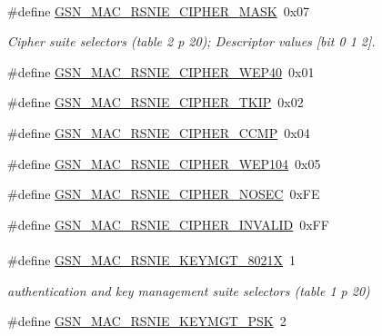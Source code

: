 \paragraph*{}
\begin{DoxyCompactItemize}
\item 
\#define \hyperlink{a00642_ga9f1db3741ca60ee70690fe908f615b05}{GSN\_\-MAC\_\-RSNIE\_\-CIPHER\_\-MASK}~0x07
\begin{DoxyCompactList}\small\item\em Cipher suite selectors (table 2 p 20); Descriptor values \mbox{[}bit 0 1 2\mbox{]}. \end{DoxyCompactList}\item 
\#define \hyperlink{a00642_gabb256ee389628678d07227a262c724cd}{GSN\_\-MAC\_\-RSNIE\_\-CIPHER\_\-WEP40}~0x01
\item 
\#define \hyperlink{a00642_ga923f017a53927b85c88857723b490d0f}{GSN\_\-MAC\_\-RSNIE\_\-CIPHER\_\-TKIP}~0x02
\item 
\#define \hyperlink{a00642_gae128a6f53a21ed1dd5cc751f5f76b063}{GSN\_\-MAC\_\-RSNIE\_\-CIPHER\_\-CCMP}~0x04
\item 
\#define \hyperlink{a00642_ga4a472fd868a0633cf337c1a3c4b0a8ed}{GSN\_\-MAC\_\-RSNIE\_\-CIPHER\_\-WEP104}~0x05
\item 
\#define \hyperlink{a00642_ga29ef5d37177a52a22dd6707dd3e943cf}{GSN\_\-MAC\_\-RSNIE\_\-CIPHER\_\-NOSEC}~0xFE
\item 
\#define \hyperlink{a00642_ga6498ff5acf21d809adebf490aaeb1158}{GSN\_\-MAC\_\-RSNIE\_\-CIPHER\_\-INVALID}~0xFF
\end{DoxyCompactItemize}

\paragraph*{}
\begin{DoxyCompactItemize}
\item 
\#define \hyperlink{a00642_ga66753c440ce19038fd3676c28b340ba3}{GSN\_\-MAC\_\-RSNIE\_\-KEYMGT\_\-8021X}~1
\begin{DoxyCompactList}\small\item\em authentication and key management suite selectors (table 1 p 20) \end{DoxyCompactList}\item 
\#define \hyperlink{a00642_ga32b9e4b675a4ef0664691d13d70e1b1b}{GSN\_\-MAC\_\-RSNIE\_\-KEYMGT\_\-PSK}~2
\end{DoxyCompactItemize}

